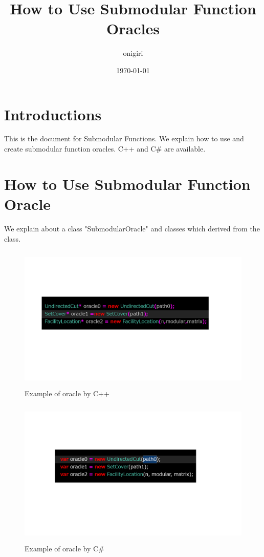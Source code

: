 \documentclass{article}
\begin{document}
\fontsize{10pt}{12pt}\selectfont
%

\title{How to Use Submodular Function Oracles }
\author{onigiri}
\date{\today}


\maketitle
\newpage


\tableofcontents

\newpage

\section{Introductions}
This is the document for Submodular Functions.
We explain how to use and create submodular function oracles.
C++ and C\# are available.

\newpage

\section{How to Use Submodular Function Oracle}
We explain about a class "SubmodularOracle" and classes which derived from the class.

\begin{figure}[h!]\label{C++OraclePic}
{
\fontsize{10pt}{12pt}\selectfont
\centering
\includegraphics[height=7.0cm]{picture/C++Oracle.png}
\caption{Example of oracle by C++}
}
\end{figure}

\begin{figure}[h!]\label{CSOraclePic}
{
\fontsize{10pt}{12pt}\selectfont
\centering
\includegraphics[height=7.0cm]{picture/CSOracle.png}
\caption{Example of oracle by C\#}
}
\end{figure}
\end{document}
